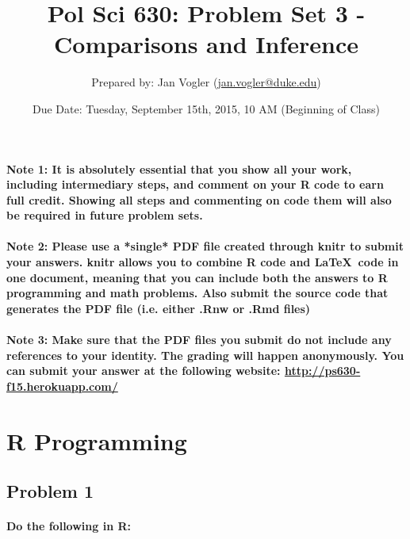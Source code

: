 \documentclass[12pt,letter]{article}
\begin{document}
\title{Pol Sci 630: Problem Set 3 - Comparisons and Inference}

\author{Prepared by: Jan Vogler (\href{mailto:jan.vogler@duke.edu}{jan.vogler@duke.edu})}

\date{Due Date: Tuesday, September 15th, 2015, 10 AM (Beginning of Class)}

\maketitle



\paragraph{Note 1: It is absolutely essential that you show all your work, including intermediary steps, and comment on your R code to earn full credit. Showing all steps and commenting on code them will also be required in future problem sets.}

\paragraph{Note 2: Please use a *single* PDF file created through knitr to submit your answers. knitr allows you to combine R code and \LaTeX \ code in one document, meaning that you can include both the answers to R programming and math problems. Also submit the source code that generates the PDF file (i.e. either .Rnw or .Rmd files)}

\paragraph{Note 3: Make sure that the PDF files you submit do not include any references to your identity. The grading will happen anonymously. You can submit your answer at the following website: \url{http://ps630-f15.herokuapp.com/}}



\section*{R Programming}

\subsection*{Problem 1}

\paragraph{Do the following in R:}
\end{document}
